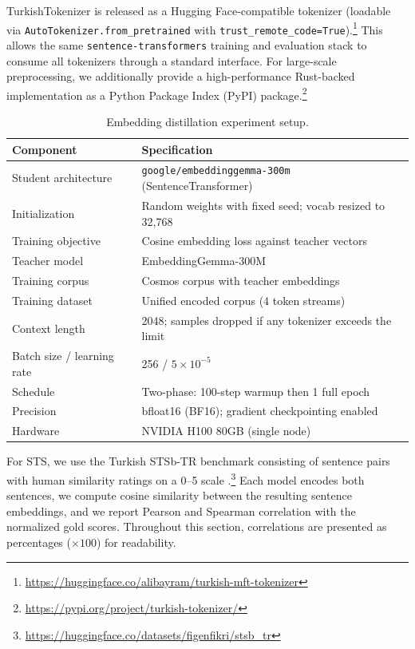 TurkishTokenizer is released as a Hugging Face-compatible tokenizer (loadable via \texttt{AutoTokenizer.from\_pretrained} with \texttt{trust\_remote\_code=True}).\footnote{\url{https://huggingface.co/alibayram/turkish-mft-tokenizer}} This allows the same \texttt{sentence-transformers} training and evaluation stack to consume all tokenizers through a standard interface. For large-scale preprocessing, we additionally provide a high-performance Rust-backed implementation as a Python Package Index (PyPI) package.\footnote{\url{https://pypi.org/project/turkish-tokenizer/}}

\begin{table}[H]
\centering
\caption{Embedding distillation experiment setup.}
\label{tab:distillation_setup}
\begin{tabular}{ll}
\toprule
\textbf{Component} & \textbf{Specification} \\
\midrule
Student architecture & \texttt{google/embeddinggemma-300m} (SentenceTransformer) \\
Initialization & Random weights with fixed seed; vocab resized to 32,768 \\
Training objective & Cosine embedding loss against teacher vectors \\
Teacher model & EmbeddingGemma-300M \\
Training corpus & Cosmos corpus with teacher embeddings \\
Training dataset & Unified encoded corpus (4 token streams) \\
Context length & 2048; samples dropped if any tokenizer exceeds the limit \\
Batch size / learning rate & 256 / $5 \times 10^{-5}$ \\
Schedule & Two-phase: 100-step warmup then 1 full epoch \\
Precision & bfloat16 (BF16); gradient checkpointing enabled \\
Hardware & NVIDIA H100 80GB (single node) \\
\bottomrule
\end{tabular}
\end{table}

For STS, we use the Turkish STSb-TR benchmark consisting of sentence pairs with human similarity ratings on a 0--5 scale \cite{beken_fikri_semantic_2021}.\footnote{\url{https://huggingface.co/datasets/figenfikri/stsb_tr}} Each model encodes both sentences, we compute cosine similarity between the resulting sentence embeddings, and we report Pearson and Spearman correlation with the normalized gold scores. Throughout this section, correlations are presented as percentages ($\times 100$) for readability.

